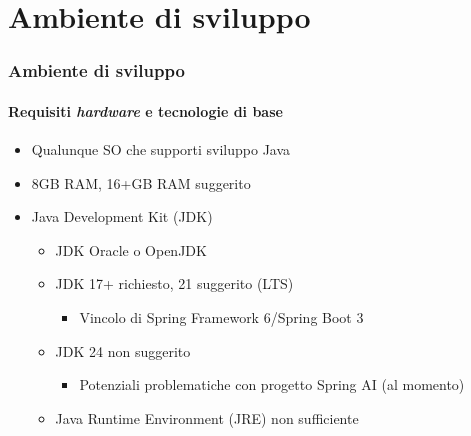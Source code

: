 \section{Ambiente di sviluppo} %
\label{sec:dev-env}
%
\begin{frame}[t,fragile] \frametitle{Ambiente di sviluppo}
\framesubtitle{Requisiti \textit{hardware} e tecnologie di base}
    \begin{itemize}[leftmargin=20pt,align=right]
        \item[\alert{\faHandORight}] Qualunque SO che supporti sviluppo Java
        \item[\alert{\faHandORight}] \alert{8GB RAM}, 16+GB RAM suggerito
        \item[\alert{\faHandORight}] Java Development Kit (JDK)     
        \begin{itemize}[leftmargin=20pt,align=right]
            \item[\alert{\faHandORight}] JDK Oracle o OpenJDK
            \item[\alert{\faHandORight}] JDK \alert{17+} richiesto, \alert{21} suggerito (LTS)
            \begin{itemize}[leftmargin=20pt,align=right]
                \item[\alert{\faHandORight}] Vincolo di Spring Framework \alert{6}/Spring Boot \alert{3}
            \end{itemize}
            \item[\alert{\faExclamationTriangle}] JDK \alert{24 non} suggerito
            \begin{itemize}[leftmargin=20pt,align=right]
                \item[\alert{\faHandORight}] Potenziali problematiche con progetto Spring AI (al momento)
            \end{itemize}
            \item[\alert{\faExclamationTriangle}] Java Runtime Environment (JRE) \alert{non} sufficiente
        \end{itemize}
    \end{itemize}
\end{frame}
%
